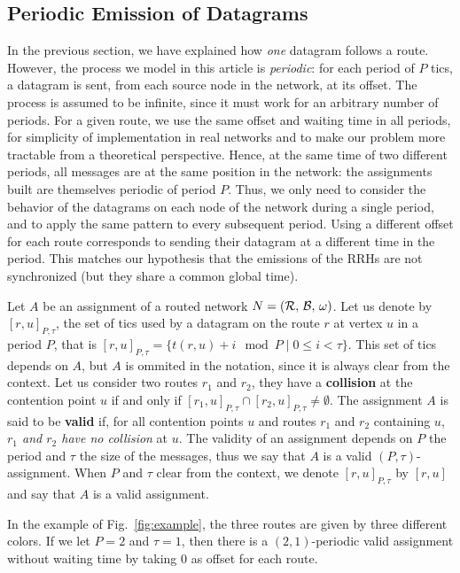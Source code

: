 \documentclass[a4paper,10pt]{article}
\begin{document}
 	\subsection{Periodic Emission of Datagrams}

	In the previous section, we have explained how \emph{one} datagram follows a route.
	However, the process we model in this article is \emph{periodic}: for each period of $P$ tics, a datagram is sent, from each source node in the network, at its offset. The process is assumed to be infinite, since it must work for an arbitrary number of periods. For a given route, we use the same offset and waiting time in all periods, for simplicity of implementation in real networks and to make our problem more tractable from a theoretical perspective. Hence, at the same time of two different periods, all messages are at the same position in the network: the assignments built are themselves periodic of period $P$. Thus, we only need to consider the behavior of the datagrams on each node of the network during a single period, and to apply the same pattern to every subsequent period. 
 	Using a different offset for each route corresponds to sending their datagram at a different time in the period. This matches our hypothesis that the emissions of the RRHs are not synchronized (but they share a common global time).

 	Let $A$ be an assignment of a routed network $N = (\cal{R},\,\cal{B},\,\omega)$.
    Let us denote by $[r,u]_{P,\tau}$, the set of tics used by a datagram on the route $r$ at vertex $u$ in a period $P$, that is $[r,u]_{P,\tau} = \{t(r,u) + i \mod P \mid 0 \leq i < \tau \}$. This set of tics depends on $A$,
    but $A$ is ommited in the notation, since it is always clear from the context.
    Let us consider two routes $r_1$ and $r_2$, they have a {\bf collision} at the contention point $u$ if and only if $[r_1,u]_{P,\tau} \cap [r_2,u]_{P,\tau} \neq \emptyset$.
    The assignment $A$ is said to be \textbf{valid} if, for all contention points $u$ and routes $r_1$ and $r_2$ containing $u$, \emph{$r_1$ and $r_2$ have no collision} at $u$. 
    The validity of an assignment depends on $P$ the period and $\tau$ the size of the messages,
    thus we say that $A$ is a valid $(P,\tau)$-assignment. When $P$ and $\tau$ clear from the context, 
    we denote $[r,u]_{P,\tau}$ by $[r,u]$ and say that $A$ is a valid assignment. 

     In the example of Fig.~\ref{fig:example}, the three routes are given by three different colors. If we let $P = 2$ and $\tau = 1$, then there is a $(2,1)$-periodic valid assignment without waiting time by taking $0$ as offset for each route.
\end{document}

